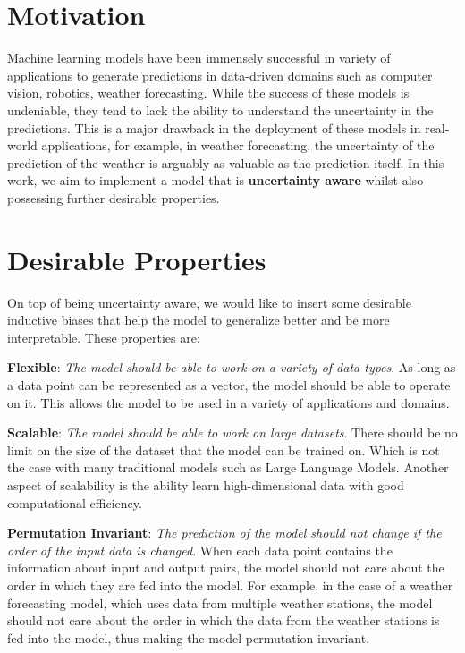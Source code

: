 \documentclass[../../main.tex]{subfiles}
\begin{document}
\section{Motivation}

Machine learning models have been immensely successful in variety of applications to generate predictions in data-driven domains such as computer vision, robotics, weather forecasting. While the success of these models is undeniable, they tend to lack the ability to understand the uncertainty in the predictions. This is a major drawback in the deployment of these models in real-world applications, for example, in weather forecasting,  the uncertainty of the prediction of the weather is arguably as valuable as the prediction itself. In this work, we aim to implement a model that is \textbf{uncertainty aware} whilst also possessing further desirable properties.

\section{Desirable Properties}

On top of being uncertainty aware, we would like to insert some desirable inductive biases that help the model to generalize better and be more interpretable. These properties are:

\textbf{Flexible}: \emph{The model should be able to work on a variety of data types}. As long as a data point can be represented as a vector, the model should be able to operate on it. This allows the model to be used in a variety of applications and domains.

\textbf{Scalable}: \emph{The model should be able to work on large datasets}.  There should be no limit on the size of the dataset that the model can be trained on. Which is not the case with many traditional models such as Large Language Models. Another aspect of scalability is the ability learn high-dimensional data with good computational efficiency.


\textbf{Permutation Invariant}: \emph{The prediction of the model should not change if the order of the input data is changed}. When each data point contains the information about input and output pairs, the model should not care about the order in which they are fed into the model. For example, in the case of a weather forecasting model, which uses data from multiple weather stations, the model should not care about the order in which the data from the weather stations is fed into the model, thus making the model permutation invariant.
\end{document}
